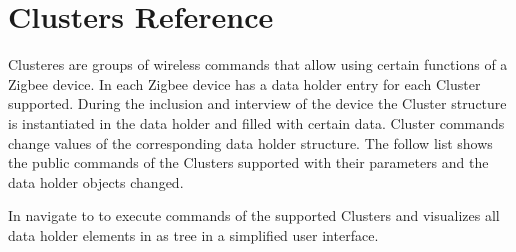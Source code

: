 \chapter{Clusters Reference}
\label{cls}
\label{Clusters}

Clusteres are groups of wireless commands that allow using certain functions of a Zigbee device.
In \zway each Zigbee device has a data holder entry for each Cluster supported. During the inclusion 
and interview of the device the Cluster structure is instantiated in the data holder and filled with 
certain data. Cluster commands change values of the corresponding data holder structure. The follow 
list shows the public commands of the Clusters supported with their parameters and the data holder 
objects changed.

In \zbeui navigate to  to execute commands 
of the supported Clusters and visualizes all data holder elements in as tree in 
a simplified user interface.
